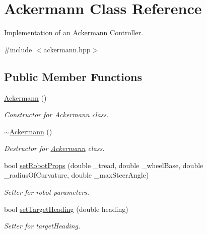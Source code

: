 \hypertarget{classAckermann}{}\section{Ackermann Class Reference}
\label{classAckermann}


Implementation of an \hyperlink{classAckermann}{Ackermann} Controller.  




{\ttfamily \#include $<$ackermann.\+hpp$>$}

\subsection*{Public Member Functions}
\begin{DoxyCompactItemize}
\item 
\mbox{\label{classAckermann_a299e66470d0778b5bd5acf2d06b61d67}} 
\hyperlink{classAckermann_a299e66470d0778b5bd5acf2d06b61d67}{Ackermann} ()
\begin{DoxyCompactList}\small\item\em Constructor for \hyperlink{classAckermann}{Ackermann} class. \end{DoxyCompactList}\item 
\mbox{\label{classAckermann_a1f33c3d021c6c5d66877cb7a0d317e0a}} 
\hyperlink{classAckermann_a1f33c3d021c6c5d66877cb7a0d317e0a}{$\sim$\+Ackermann} ()
\begin{DoxyCompactList}\small\item\em Destructor for \hyperlink{classAckermann}{Ackermann} class. \end{DoxyCompactList}\item 
bool \hyperlink{classAckermann_a70edfb9472f629092736004586a5b3ce}{set\+Robot\+Props} (double \+\_\+tread, double \+\_\+wheel\+Base, double \+\_\+radius\+Of\+Curvature, double \+\_\+max\+Steer\+Angle)
\begin{DoxyCompactList}\small\item\em Setter for robot parameters. \end{DoxyCompactList}\item 
bool \hyperlink{classAckermann_ae03561a8d47231a26dcbb0e8661b29b1}{set\+Target\+Heading} (double heading)
\begin{DoxyCompactList}\small\item\em Setter for target\+Heading. \end{DoxyCompactList}\item 

\end{DoxyCompactItemize}
